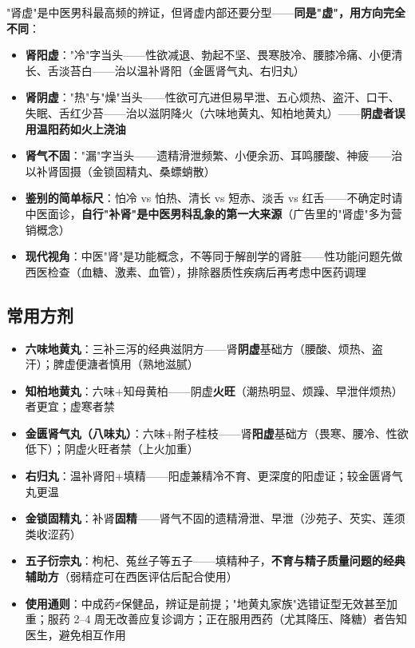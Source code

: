 \documentclass[12pt,a4paper,twoside]{ctexbook}
\begin{document}
"肾虚"是中医男科最高频的辨证，但肾虚内部还要分型——\textbf{同是"虚"，用方向完全不同}：

\begin{itemize}
	\item \textbf{肾阳虚}："冷"字当头——性欲减退、勃起不坚、畏寒肢冷、腰膝冷痛、小便清长、舌淡苔白——治以温补肾阳（金匮肾气丸、右归丸）
	\item \textbf{肾阴虚}："热"与"燥"当头——性欲可亢进但易早泄、五心烦热、盗汗、口干、失眠、舌红少苔——治以滋阴降火（六味地黄丸、知柏地黄丸）——\textbf{阴虚者误用温阳药如火上浇油}
	\item \textbf{肾气不固}："漏"字当头——遗精滑泄频繁、小便余沥、耳鸣腰酸、神疲——治以补肾固摄（金锁固精丸、桑螵蛸散）
	\item \textbf{鉴别的简单标尺}：怕冷 vs 怕热、清长 vs 短赤、淡舌 vs 红舌——不确定时请中医面诊，\textbf{自行"补肾"是中医男科乱象的第一大来源}（广告里的"肾虚"多为营销概念）
	\item \textbf{现代视角}：中医"肾"是功能概念，不等同于解剖学的肾脏——性功能问题先做西医检查（血糖、激素、血管），排除器质性疾病后再考虑中医药调理
\end{itemize}

\subsection{常用方剂}


\begin{itemize}
	\item \textbf{六味地黄丸}：三补三泻的经典滋阴方——肾\textbf{阴虚}基础方（腰酸、烦热、盗汗）；脾虚便溏者慎用（熟地滋腻）
	\item \textbf{知柏地黄丸}：六味+知母黄柏——阴虚\textbf{火旺}（潮热明显、烦躁、早泄伴烦热）者更宜；虚寒者禁
	\item \textbf{金匮肾气丸（八味丸）}：六味+附子桂枝——肾\textbf{阳虚}基础方（畏寒、腰冷、性欲低下）；阴虚火旺者禁（上火加重）
	\item \textbf{右归丸}：温补肾阳+填精——阳虚兼精冷不育、更深度的阳虚证；较金匮肾气丸更温
	\item \textbf{金锁固精丸}：补肾\textbf{固精}——肾气不固的遗精滑泄、早泄（沙苑子、芡实、莲须类收涩药）
	\item \textbf{五子衍宗丸}：枸杞、菟丝子等五子——填精种子，\textbf{不育与精子质量问题的经典辅助方}（弱精症可在西医评估后配合使用）
	\item \textbf{使用通则}：中成药≠保健品，辨证是前提；"地黄丸家族"选错证型无效甚至加重；服药 2--4 周无改善应复诊调方；正在服用西药（尤其降压、降糖）者告知医生，避免相互作用
\end{itemize}
\end{document}
